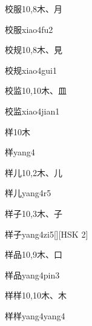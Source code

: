 \begin{entry}{校服}{10,8}{⽊、⽉}
  \begin{phonetics}{校服}{xiao4fu2}
  \end{phonetics}
\end{entry}

\begin{entry}{校规}{10,8}{⽊、⾒}
  \begin{phonetics}{校规}{xiao4gui1}
  \end{phonetics}
\end{entry}

\begin{entry}{校监}{10,10}{⽊、⽫}
  \begin{phonetics}{校监}{xiao4jian1}
  \end{phonetics}
\end{entry}

\begin{entry}{样}{10}{⽊}
  \begin{phonetics}{样}{yang4}
  \end{phonetics}
\end{entry}

\begin{entry}{样儿}{10,2}{⽊、⼉}
  \begin{phonetics}{样儿}{yang4r5}
  \end{phonetics}
\end{entry}

\begin{entry}{样子}{10,3}{⽊、⼦}
  \begin{phonetics}{样子}{yang4zi5}[][HSK 2]
  \end{phonetics}
\end{entry}

\begin{entry}{样品}{10,9}{⽊、⼝}
  \begin{phonetics}{样品}{yang4pin3}
  \end{phonetics}
\end{entry}

\begin{entry}{样样}{10,10}{⽊、⽊}
  \begin{phonetics}{样样}{yang4yang4}
  \end{phonetics}
\end{entry}

